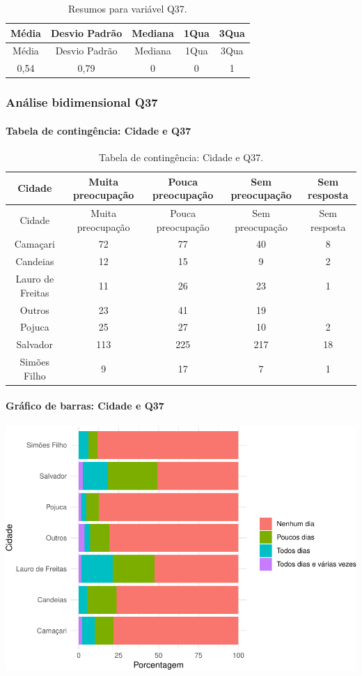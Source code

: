 \documentclass[]{article}
\let\oldparagraph\paragraph
\renewcommand{\paragraph}[1]{\oldparagraph{#1}\mbox{}}
\begin{document}
\begin{longtable}[]{@{}ccccc@{}}
\caption{\label{tab:unnamed-chunk-1368}Resumos para variável Q37.}\tabularnewline
\toprule
Média & Desvio Padrão & Mediana & 1Qua & 3Qua\tabularnewline
\midrule
\endfirsthead
\toprule
Média & Desvio Padrão & Mediana & 1Qua & 3Qua\tabularnewline
\midrule
\endhead
0,54 & 0,79 & 0 & 0 & 1\tabularnewline
\bottomrule
\end{longtable}

\cleardoublepage

\hypertarget{anuxe1lise-bidimensional-q37}{%
\subsubsection{Análise bidimensional Q37}\label{anuxe1lise-bidimensional-q37}}

\hypertarget{tabela-de-continguxeancia-cidade-e-q37}{%
\paragraph{Tabela de contingência: Cidade e Q37}\label{tabela-de-continguxeancia-cidade-e-q37}}

\begin{longtable}[]{@{}ccccc@{}}
\caption{\label{tab:unnamed-chunk-1369}Tabela de contingência: Cidade e Q37.}\tabularnewline
\toprule
Cidade & Muita preocupação & Pouca preocupação & Sem preocupação & Sem resposta\tabularnewline
\midrule
\endfirsthead
\toprule
Cidade & Muita preocupação & Pouca preocupação & Sem preocupação & Sem resposta\tabularnewline
\midrule
\endhead
Camaçari & 72 & 77 & 40 & 8\tabularnewline
Candeias & 12 & 15 & 9 & 2\tabularnewline
Lauro de Freitas & 11 & 26 & 23 & 1\tabularnewline
Outros & 23 & 41 & 19 &\tabularnewline
Pojuca & 25 & 27 & 10 & 2\tabularnewline
Salvador & 113 & 225 & 217 & 18\tabularnewline
Simões Filho & 9 & 17 & 7 & 1\tabularnewline
\bottomrule
\end{longtable}

\hypertarget{gruxe1fico-de-barras-cidade-e-q37}{%
\paragraph{Gráfico de barras: Cidade e Q37}\label{gruxe1fico-de-barras-cidade-e-q37}}

\begin{center}\includegraphics[width=0.75\linewidth]{relatorio_covid19_files/figure-latex/unnamed-chunk-1370-1} \end{center}
\end{document}
